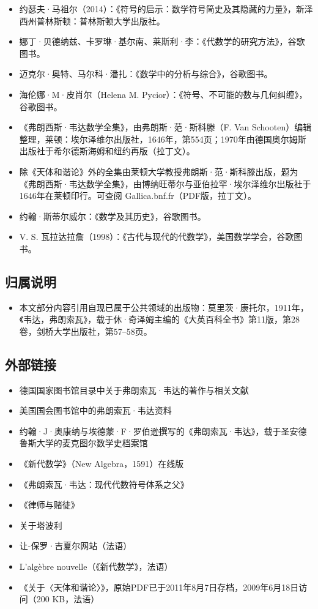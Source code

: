 \begin{itemize}
\item 约瑟夫·马祖尔（2014）：《符号的启示：数学符号简史及其隐藏的力量》，新泽西州普林斯顿：普林斯顿大学出版社。
\item 娜丁·贝德纳兹、卡罗琳·基尔南、莱斯利·李：《代数学的研究方法》，谷歌图书。
\item 迈克尔·奥特、马尔科·潘扎：《数学中的分析与综合》，谷歌图书。
\item 海伦娜·M·皮肖尔（Helena M. Pycior）：《符号、不可能的数与几何纠缠》，谷歌图书。
\item 《弗朗西斯·韦达数学全集》，由弗朗斯·范·斯科滕（F. Van Schooten）编辑整理，莱顿：埃尔泽维尔出版社，1646年，第554页；1970年由德国奥尔姆斯出版社于希尔德斯海姆和纽约再版（拉丁文）。
\item 除《天体和谐论》外的全集由莱顿大学教授弗朗斯·范·斯科滕出版，题为《弗朗西斯·韦达数学全集》，由博纳旺蒂尔与亚伯拉罕·埃尔泽维尔出版社于1646年在莱顿印行。可查阅 Gallica.bnf.fr（PDF版，拉丁文）。
\item 约翰·斯蒂尔威尔：《数学及其历史》，谷歌图书。
\item V. S. 瓦拉达拉詹（1998）：《古代与现代的代数学》，美国数学学会，谷歌图书。
\end{itemize}
\subsection{归属说明}
\begin{itemize}
\item 本文部分内容引用自现已属于公共领域的出版物：莫里茨·康托尔，1911年，《韦达，弗朗索瓦》，载于休·奇泽姆主编的《大英百科全书》第11版，第28卷，剑桥大学出版社，第57–58页。
\end{itemize}
\subsection{外部链接}
\begin{itemize}
\item 德国国家图书馆目录中关于弗朗索瓦·韦达的著作与相关文献
\item 美国国会图书馆中的弗朗索瓦·韦达资料
\item 约翰·J·奥康纳与埃德蒙·F·罗伯逊撰写的《弗朗索瓦·韦达》，载于圣安德鲁斯大学的麦克图尔数学史档案馆
\item 《新代数学》（New Algebra，1591）在线版
\item 《弗朗索瓦·韦达：现代代数符号体系之父》
\item 《律师与赌徒》
\item 关于塔波利
\item 让-保罗·吉夏尔网站（法语）
\item L'algèbre nouvelle（《新代数学》，法语）
\item 《关于〈天体和谐论〉》，原始PDF已于2011年8月7日存档，2009年6月18日访问（200 KB，法语）
\end{itemize}